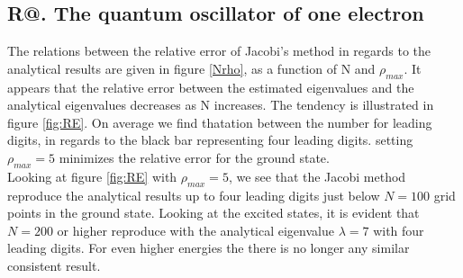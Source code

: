 \documentclass[%
reprint,
amsmath,amssymb,
aps,
]{revtex4-1}
\makeatletter
\newcommand*{\rom}[1]{\expandafter\@slowromancap\romannumeral #1@}
\makeatother
\begin{document}
\subsection*{R\rom{2}. The quantum oscillator of one electron} \noindent 
The relations between the relative error of Jacobi's method in regards to the analytical results are given in figure \ref{Nrho}, as a function of N and $\rho_{max}$. It appears that the relative error between the estimated eigenvalues and the analytical eigenvalues decreases as N increases. The tendency is illustrated in figure \ref{fig:RE}. On average we find thatation between the number for leading digits, in regards to the black bar representing four leading digits. setting $\rho_{max} = 5$ minimizes the relative error for the ground state. \\ \indent 
Looking at figure \ref{fig:RE} with $\rho_{max} = 5$, we see that the Jacobi method reproduce the analytical results up to four leading digits just below $N=100$ grid points in the ground state. Looking at the excited states, it is evident that $N=200$  or higher reproduce with the analytical eigenvalue $\lambda = 7$ with four leading digits. For even higher energies the there is no longer any similar consistent result. \\
\end{document}
